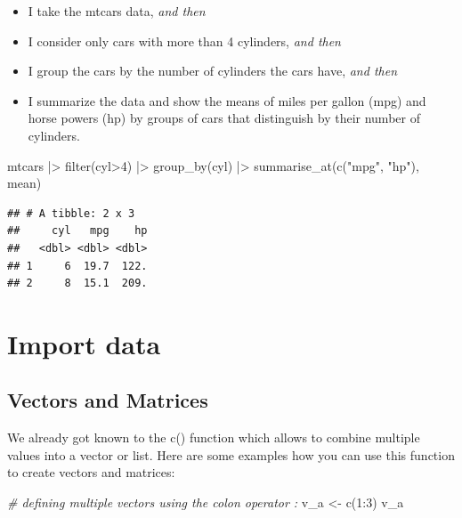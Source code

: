 \documentclass[
  12pt,
  oneside]{book}
\newenvironment{Shaded}{\begin{snugshade}}{\end{snugshade}}
\newcommand{\CommentTok}[1]{\textcolor[rgb]{0.56,0.35,0.01}{\textit{#1}}}
\newcommand{\DecValTok}[1]{\textcolor[rgb]{0.00,0.00,0.81}{#1}}
\newcommand{\FunctionTok}[1]{\textcolor[rgb]{0.00,0.00,0.00}{#1}}
\newcommand{\NormalTok}[1]{#1}
\newcommand{\OtherTok}[1]{\textcolor[rgb]{0.56,0.35,0.01}{#1}}
\newcommand{\SpecialCharTok}[1]{\textcolor[rgb]{0.00,0.00,0.00}{#1}}
\newcommand{\StringTok}[1]{\textcolor[rgb]{0.31,0.60,0.02}{#1}}
\providecommand{\tightlist}{%
  \setlength{\itemsep}{0pt}\setlength{\parskip}{0pt}}
\theoremstyle{definition}
\theoremstyle{definition}
\theoremstyle{definition}
\theoremstyle{definition}
\theoremstyle{remark}
\begin{document}
\begin{itemize}
\tightlist
\item
  I take the mtcars data, \emph{and then}
\item
  I consider only cars with more than 4 cylinders, \emph{and then}
\item
  I group the cars by the number of cylinders the cars have, \emph{and then}
\item
  I summarize the data and show the means of miles per gallon (mpg) and horse powers (hp) by groups of cars that distinguish by their number of cylinders.
\end{itemize}

\begin{Shaded}
\begin{Highlighting}[]
\NormalTok{mtcars }\SpecialCharTok{|\textgreater{}} 
  \FunctionTok{filter}\NormalTok{(cyl}\SpecialCharTok{\textgreater{}}\DecValTok{4}\NormalTok{) }\SpecialCharTok{|\textgreater{}} 
  \FunctionTok{group\_by}\NormalTok{(cyl) }\SpecialCharTok{|\textgreater{}} 
  \FunctionTok{summarise\_at}\NormalTok{(}\FunctionTok{c}\NormalTok{(}\StringTok{"mpg"}\NormalTok{, }\StringTok{"hp"}\NormalTok{), mean)}
\end{Highlighting}
\end{Shaded}

\begin{verbatim}
## # A tibble: 2 x 3
##     cyl   mpg    hp
##   <dbl> <dbl> <dbl>
## 1     6  19.7  122.
## 2     8  15.1  209.
\end{verbatim}

\hypertarget{import-data}{%
\section{Import data}\label{import-data}}

\hypertarget{vectors-and-matrices}{%
\subsection{Vectors and Matrices}\label{vectors-and-matrices}}

We already got known to the c() function which allows to combine multiple values into a vector or list. Here are some examples how you can use this function to create vectors and matrices:

\begin{Shaded}
\begin{Highlighting}[]
\CommentTok{\# defining multiple vectors using the colon operator \textasciigrave{}:\textasciigrave{}}
\NormalTok{v\_a }\OtherTok{\textless{}{-}} \FunctionTok{c}\NormalTok{(}\DecValTok{1}\SpecialCharTok{:}\DecValTok{3}\NormalTok{)}
\NormalTok{v\_a}
\end{Highlighting}
\end{Shaded}
\end{document}
